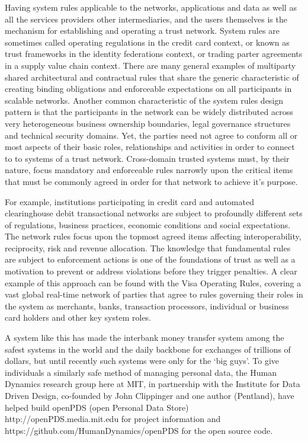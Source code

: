 Having system rules applicable to the networks, applications and data as well as all the services providers other intermediaries, and the users themselves is the mechanism for establishing and operating a trust network.
System rules are sometimes called operating regulations in the credit card context, or known as trust frameworks in the identity federations context, or trading parter agreements in a supply value chain context.
There are many general examples of multiparty shared architectural and contractual rules that share the generic characteristic of creating binding obligations and enforceable expectations on all participants in scalable networks.
Another common characteristic of the system rules design pattern is that the participants in the network can be widely distributed across very heterogeneous business ownership boundaries, legal governance structures and technical security domains.
Yet, the parties need not agree to conform all or most aspects of their basic roles, relationships and activities in order to connect to to systems of a trust network.
Cross-domain trusted systems must, by their nature, focus mandatory and enforceable rules narrowly upon the critical items that must be commonly agreed in order for that network to achieve it's purpose.

For example, institutions participating in credit card and automated clearinghouse debit transactional networks are subject to profoundly different sets of regulations, business practices, economic conditions and social expectations.
The network rules focus upon the topmost agreed items affecting interoperability, reciprocity, risk and revenue allocation.
The knowledge that fundamental rules are subject to enforcement actions is one of the foundations of trust as well as a motivation to prevent or address violations before they trigger penalties. 
A clear example of this approach can be found with the Visa Operating Rules, covering a vast global real-time network of parties that agree to rules governing their roles in the system as merchants, banks, transaction processors, individual or business card holders and other key system roles.

A system like this has made the interbank money transfer system among the safest systems in the world and the daily backbone for exchanges of trillions of dollars, but until recently such systems were only for the `big guys’.
To give individuals a similarly safe method of managing personal data, the Human Dynamics research group here at MIT, in partnership with the Institute for Data Driven Design, co-founded by John Clippinger and one author (Pentland), have helped build openPDS (open Personal Data Store) http://openPDS.media.mit.edu for project information and https://github.com/HumanDynamics/openPDS for the open source code.

